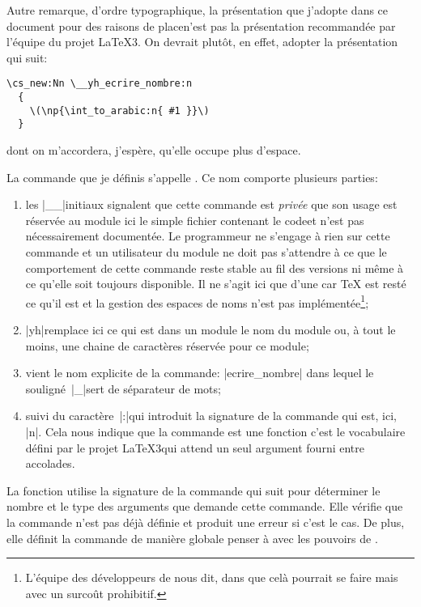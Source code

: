 Autre remarque, d'ordre typographique, la présentation que j'adopte
dans ce document \TO pour des raisons de place\TF n'est pas la
présentation recommandée par l'équipe du projet \LaTeX3. On devrait
plutôt, en effet, adopter la présentation qui suit:
%
\begin{Verbatim}[frame=lines, framesep=0.75\baselineskip]
\cs_new:Nn \__yh_ecrire_nombre:n 
  { 
    \(\np{\int_to_arabic:n{ #1 }}\) 
  }
\end{Verbatim}
%
dont on m'accordera, j'espère, qu'elle occupe plus d'espace.

La commande que je définis s'appelle
. Ce nom comporte plusieurs parties:
\begin{enumerate}
  
\item les \og |__|\fg initiaux signalent que cette commande est
  \emph{privée} \CAD que son usage est réservée au \gls{module} \TO
  ici le simple fichier contenant le code\TF et n'est pas
  nécessairement documentée. Le programmeur ne s'engage à rien sur
  cette commande et un utilisateur du \gls{module} ne doit pas
  s'attendre à ce que le comportement de cette commande reste stable
  au fil des versions ni même à ce qu'elle soit toujours
  disponible. Il ne s'agit ici que d'une  car
  \TeX{} est resté ce qu'il est et la gestion des espaces de noms
  n'est pas implémentée\footnote{L'équipe des développeurs de
    \Expliii{} nous dit, dans \autocite[p.~1]{expl3progr} que celà
    pourrait se faire mais avec un surcoût prohibitif.};
  
\item \og |yh|\fg remplace ici ce qui est \TO dans un \gls{module}\TF
  le nom du \gls{module} ou, à tout le moins, une chaine de caractères
  réservée pour ce \gls{module};
  
\item vient le nom explicite de la commande: \og |ecrire_nombre|\fg
  dans lequel le souligné~\og |_|\fg sert de séparateur de mots;
  
\item suivi du caractère~\og |:|\fg qui introduit la \gls{signature}
  de la commande qui est, ici, \og |n|\fg. Cela nous indique que la
  commande est une \gls{fonction} \TO c'est le vocabulaire défini par le
  projet \LaTeX3\TF qui attend un seul argument fourni entre
  accolades.
\end{enumerate}

La fonction  utilise la \gls{signature} de la
commande qui suit pour déterminer le nombre et le type des arguments
que demande cette commande. Elle vérifie que la commande n'est pas
déjà définie et produit une erreur si c'est le cas. De plus, elle
définit la commande de manière globale \TO penser à  avec
les pouvoirs de \TF.


